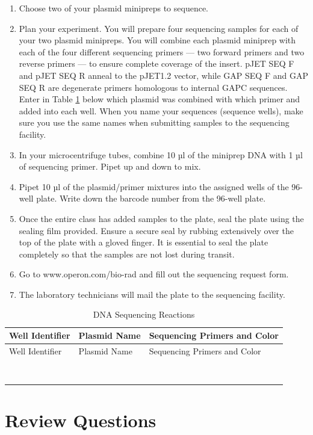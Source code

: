 \documentclass[]{book}
\providecommand{\tightlist}{%
  \setlength{\itemsep}{0pt}\setlength{\parskip}{0pt}}
\begin{document}
\begin{enumerate}
\def\labelenumi{\arabic{enumi}.}
\tightlist
\item
  Choose two of your plasmid minipreps to sequence.
\item
  Plan your experiment. You will prepare four sequencing samples for each of your two plasmid minipreps. You will combine each plasmid miniprep with each of the four different sequencing primers --- two forward primers and two reverse primers --- to ensure complete coverage of the insert. pJET SEQ F and pJET SEQ R anneal to the pJET1.2 vector, while GAP SEQ F and GAP SEQ R are degenerate primers homologous to internal GAPC sequences.
  Enter in Table \ref{tab:seq} below which plasmid was combined with which primer and added into each well. When you name your sequences (sequence wells), make sure you use the same names when submitting samples to the sequencing facility.
\item
  In your microcentrifuge tubes, combine 10 µl of the miniprep DNA with 1 µl of sequencing primer. Pipet up and down to mix.
\item
  Pipet 10 µl of the plasmid/primer mixtures into the assigned wells of the 96-well plate. Write down the barcode number from the 96-well plate.
\item
  Once the entire class has added samples to the plate, seal the plate using the sealing film provided. Ensure a secure seal by rubbing extensively over the top of the plate with a gloved finger. It is essential to seal the plate completely so that the samples are not lost during transit.
\item
  Go to www.operon.com/bio-rad and fill out the sequencing request form.
\item
  The laboratory technicians will mail the plate to the sequencing facility.
\end{enumerate}

\begin{longtable}[]{@{}lll@{}}
\caption{\label{tab:seq} DNA Sequencing Reactions}\tabularnewline
\toprule
Well Identifier & Plasmid Name & Sequencing Primers and Color\tabularnewline
\midrule
\endfirsthead
\toprule
Well Identifier & Plasmid Name & Sequencing Primers and Color\tabularnewline
\midrule
\endhead
& &\tabularnewline
& &\tabularnewline
& &\tabularnewline
& &\tabularnewline
& &\tabularnewline
& &\tabularnewline
& &\tabularnewline
& &\tabularnewline
\bottomrule
\end{longtable}

\hypertarget{review-questions-9}{%
\section{Review Questions}\label{review-questions-9}}
\end{document}

